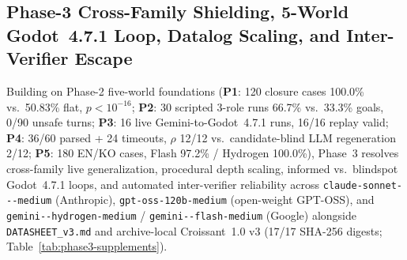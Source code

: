 \subsection{Phase-3 Cross-Family Shielding, 5-World Godot~4.7.1 Loop, Datalog Scaling, and Inter-Verifier Escape}\label{sec:phase3-supplements}
Building on Phase-2 five-world foundations (\textbf{P1}: 120 closure cases 100.0\% vs.\ 50.83\% flat, $p{<}10^{-16}$; \textbf{P2}: 30 scripted 3-role runs 66.7\% vs.\ 33.3\% goals, 0/90 unsafe turns; \textbf{P3}: 16 live Gemini-to-Godot~4.7.1 runs, 16/16 replay valid; \textbf{P4}: 36/60 parsed + 24 timeouts, $\rho$ 12/12 vs.\ candidate-blind LLM regeneration 2/12; \textbf{P5}: 180 EN/KO cases, Flash 97.2\% / Hydrogen 100.0\%), Phase~3 resolves cross-family live generalization, procedural depth scaling, informed vs.\ blindspot Godot~4.7.1 loops, and automated inter-verifier reliability across \texttt{claude-\allowbreak sonnet---\allowbreak medium} (Anthropic), \texttt{gpt-\allowbreak oss-\allowbreak 120b-\allowbreak medium} (open-weight GPT-OSS), and \texttt{gemini--\allowbreak hydrogen-\allowbreak medium} / \texttt{gemini--\allowbreak flash-\allowbreak medium} (Google) alongside \texttt{DATASHEET\_v3.md} and archive-local Croissant~1.0 v3 (17/17 SHA-256 digests; Table~\ref{tab:phase3-supplements}).

